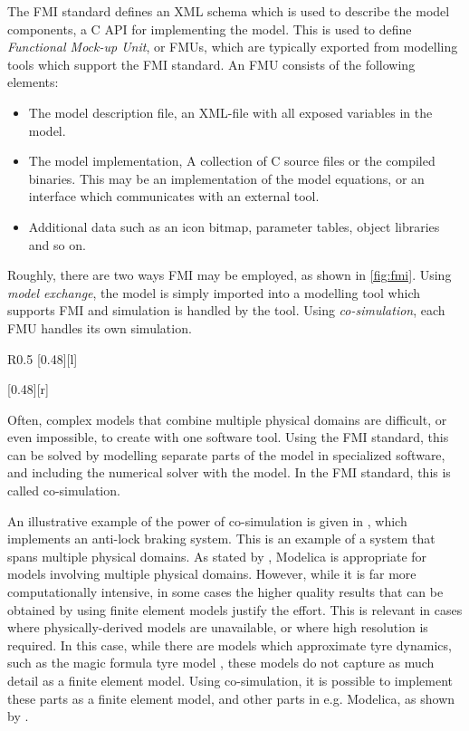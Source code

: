 \documentclass[\rootfolder/main.tex]{subfiles}
\begin{document}
The FMI standard defines an XML schema which is used to describe the model components, a C API for implementing the model.
This is used to define \emph{Functional Mock-up Unit}, or FMUs, which are typically exported from modelling tools which support the FMI standard.
An FMU consists of the following elements:

\begin{itemize}
    \item The model description file, an XML-file with all exposed variables in the model.
    \item The model implementation, A collection of C source files or the compiled binaries.
        This may be an implementation of the model equations, or an interface which communicates with an external tool.
    \item Additional data such as an icon bitmap, parameter tables, object libraries and so on.
\end{itemize}

Roughly, there are two ways FMI may be employed, as shown in \cref{fig:fmi}.
Using \emph{model exchange}, the model is simply imported into a modelling tool which supports FMI and simulation is handled by the tool.
Using \emph{co-simulation}, each FMU handles its own simulation.

\begin{wrapfigure}{R}{0.5\columnwidth}
    \centering
    [0.48\columnwidth][l]{}\par\bigskip
    [0.48\columnwidth][r]{}
    \caption{The two interface standards for FMI.\label{fig:fmi}}
\end{wrapfigure}

Often, complex models that combine multiple physical domains are difficult, or even impossible, to create with one software tool.
Using the FMI standard, this can be solved by modelling separate parts of the model in specialized software, and including the numerical solver with the model.
In the FMI standard, this is called co-simulation.

An illustrative example of the power of co-simulation is given in \cite{Schofield}, which implements an anti-lock braking system.
This is an example of a system that spans multiple physical domains.
As stated by \cite{Schofield}, Modelica is appropriate for models involving multiple physical domains.
However, while it is far more computationally intensive, in some cases the higher quality results that can be obtained by using finite element models justify the effort.
This is relevant in cases where physically-derived models are unavailable, or where high resolution is required.
In this case, while there are models which approximate tyre dynamics, such as the magic formula tyre model \cite{Pacejka2012}, these models do not capture as much detail as a finite element model.
Using co-simulation, it is possible to implement these parts as a finite element model, and other parts in e.g. Modelica, as shown by \cite{Schofield}.
\end{document}

